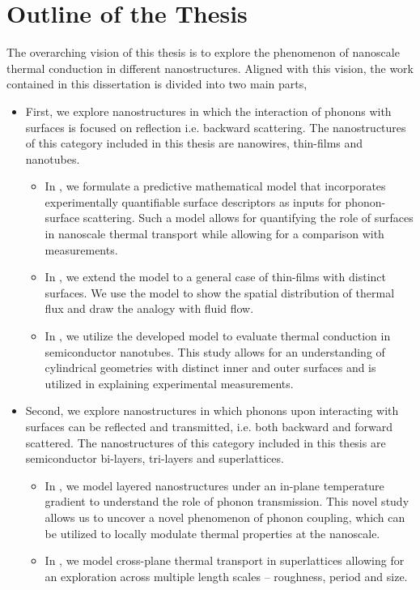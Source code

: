 \section{Outline of the Thesis}
The overarching vision of this thesis is to explore the phenomenon of nanoscale thermal conduction in different nanostructures. Aligned with this vision, the work contained in this dissertation is divided into two main parts,
\begin{itemize}
\item First, we explore nanostructures in which the interaction of phonons with surfaces is focused on reflection i.e. backward scattering.  The nanostructures of this category included in this thesis are nanowires, thin-films and nanotubes. 
	\begin{itemize}
	
	\item In , we formulate a predictive mathematical model that incorporates experimentally quantifiable surface descriptors as inputs for phonon-surface scattering. Such a model allows for quantifying the role of surfaces in nanoscale thermal transport while allowing for a comparison with measurements.
	
	\item In , we extend the model to a general case of thin-films with distinct surfaces. We use the model to show the spatial distribution of thermal flux and draw the analogy with fluid flow.
	
	\item In , we utilize the developed model to evaluate thermal conduction in semiconductor nanotubes. This study allows for an understanding of cylindrical geometries with distinct inner and outer surfaces and is utilized in explaining experimental measurements.
	\end{itemize}
	
	\item Second, we explore nanostructures in which phonons upon interacting with surfaces can be reflected and transmitted, i.e. both backward and forward scattered. The nanostructures of this category included in this thesis are semiconductor bi-layers, tri-layers and superlattices.
	\begin{itemize}
	\item In , we model layered nanostructures under an in-plane temperature gradient to understand the role of phonon transmission. This novel study allows us to uncover a novel phenomenon of phonon coupling, which can be utilized to locally modulate thermal properties at the nanoscale.
	\item In , we model cross-plane thermal transport in superlattices allowing for an exploration across multiple length scales -- roughness, period and size. 
	\end{itemize}
	
\end{itemize}





